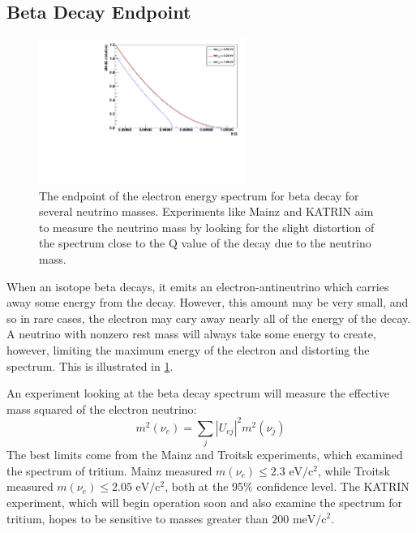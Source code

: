 \documentclass[herrin-thesis.tex]{subfiles}
\begin{document}
\subsection{Beta Decay Endpoint}
\begin{figure}
	\centering
	\includegraphics[width=0.6\textwidth]{./plots/nu_beta_endpt.pdf}
	\caption[Beta decay spectrum endpoint for massive neutrinos]{The endpoint of the electron energy spectrum for beta decay for several neutrino masses. Experiments like Mainz and KATRIN aim to measure the neutrino mass by looking for the slight distortion of the spectrum close to the Q value of the decay due to the neutrino mass.}
	\label{fig:nu_beta_endpt}
\end{figure}

When an isotope beta decays, it emits an electron-antineutrino which carries away some energy from the decay. However, this amount may be very small, and so in rare cases, the electron may cary away nearly all of the energy of the decay. A neutrino with nonzero rest mass will always take some energy to create, however, limiting the maximum energy of the electron and distorting the spectrum. This is illustrated in \cref{fig:nu_beta_endpt}.

An experiment looking at the beta decay spectrum will measure the effective mass squared of the electron neutrino:
\begin{equation}
m^2\left(\nu_e\right) = \sum_j \left | U_{e j} \right |^2 m^2\left(\nu_j\right)
\label{eq:nu_beta_endpt_mass}
\end{equation}
The best limits come from the Mainz and Troitsk experiments, which examined the spectrum of tritium. Mainz measured \(m(\nu_e) \leq 2.3 \text{ eV}/\text{c}^{2}\)\cite{Kraus:2005nx}, while Troitsk measured \(m(\nu_e) \leq 2.05 \text{ eV}/\text{c}^{2}\)\cite{Aseev:2011dq}, both at the 95\% confidence level. The KATRIN experiment, which will begin operation soon and also examine the spectrum for tritium, hopes to be sensitive to masses greater than \(200\text{ meV}/\text{c}^2\)\cite{Osipowicz:2001oq}.
\end{document}
